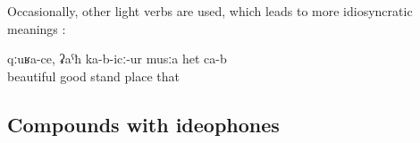 Occasionally, other light verbs are used, which leads to more idiosyncratic meanings :
%
\begin{exe}
	\ex	\label{ex:This is a beautiful, pleasant place}
	\gll	qːuʁa-ce,	ʡaˁħ	ka-b-icː-ur	musːa	het	ca-b\\
		beautiful	good	stand	place	that	\\
	\glt	{}
	

\end{exe}



\subsection{Compounds with ideophones}
\label{ssec:compoundswithideophones}

